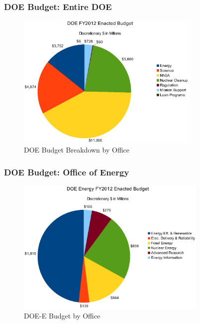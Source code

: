 \begin{frame}[ctb!]
  \frametitle{DOE Budget: Entire DOE}
  \begin{figure}[htbp!]
    \begin{center}
      \includegraphics[height=6.5cm]{doe.eps}
    \caption{DOE Budget Breakdown by Office\cite{chu_2012}}
    \label{fig:doe}
    \end{center}
  \end{figure}
\end{frame}

\begin{frame}[ctb!]
  \frametitle{DOE Budget: Office of Energy}
  \begin{figure}[htbp!]
    \begin{center}
      \includegraphics[height=6.5cm]{doe-e.eps}
    \caption{DOE-E Budget by Office\cite{chu_2012}}
    \label{fig:doe-e}
    \end{center}
  \end{figure}
\end{frame}

